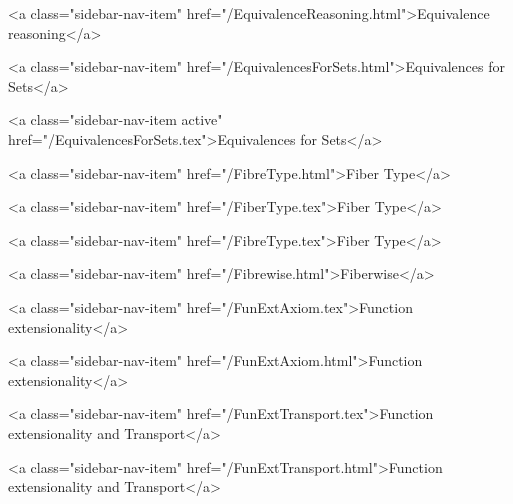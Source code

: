       
        
          <a class="sidebar-nav-item" href="/EquivalenceReasoning.html">Equivalence reasoning</a>
        
      
    
      
        
          <a class="sidebar-nav-item" href="/EquivalencesForSets.html">Equivalences for Sets</a>
        
      
    
      
        
          <a class="sidebar-nav-item active" href="/EquivalencesForSets.tex">Equivalences for Sets</a>
        
      
    
      
        
          <a class="sidebar-nav-item" href="/FibreType.html">Fiber Type</a>
        
      
    
      
        
          <a class="sidebar-nav-item" href="/FiberType.tex">Fiber Type</a>
        
      
    
      
        
          <a class="sidebar-nav-item" href="/FibreType.tex">Fiber Type</a>
        
      
    
      
        
          <a class="sidebar-nav-item" href="/Fibrewise.html">Fiberwise</a>
        
      
    
      
        
          <a class="sidebar-nav-item" href="/FunExtAxiom.tex">Function extensionality</a>
        
      
    
      
        
          <a class="sidebar-nav-item" href="/FunExtAxiom.html">Function extensionality</a>
        
      
    
      
        
          <a class="sidebar-nav-item" href="/FunExtTransport.tex">Function extensionality and Transport</a>
        
      
    
      
        
          <a class="sidebar-nav-item" href="/FunExtTransport.html">Function extensionality and Transport</a>
        
